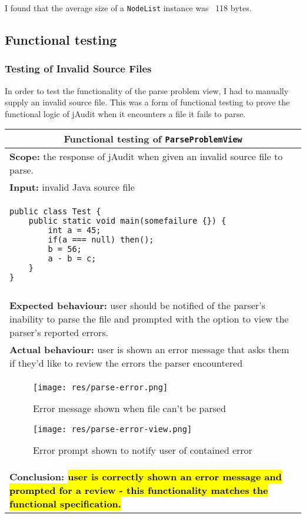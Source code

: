 \documentclass[9pt]{article}
\DeclareRobustCommand{\hlgreen}[1]{{\sethlcolor{green}\hl{#1}}}
\begin{document}
			I found that the average size of a \texttt{NodeList} instance was
			~118 bytes.

	\subsection{Functional testing}
		
		\subsubsection{Testing of Invalid Source Files}
			In order to test the functionality of the parse problem view, I had
			to manually supply an invalid source file. This was a form of
			functional testing to prove the functional logic of jAudit when it
			encounters a file it fails to parse.

			\begin{center}
				\begin{tabular}{ |p{13cm}|  }
					\hline
					\multicolumn{2}{|c|}{Functional testing of
					\texttt{ParseProblemView}} \\
					\hline
						\textbf{Scope:} the response of jAudit when given an
						invalid source file to parse.\\
					\hline
						\textbf{Input:} invalid Java source file \\
					\hline
						\begin{verbatim}
public class Test {
	public static void main(somefailure {}) {
		int a = 45;
		if(a === null) then();
		b = 56;
		a - b = c;
	}
}
						\end{verbatim}\\
					\hline\\
						\textbf{Expected behaviour:} user should be notified of
						the parser's inability to parse the file and prompted
						with the option to view the parser's reported errors. \\
					\hline
						\textbf{Actual behaviour:} user is shown an error
						message that asks them if they'd like to review the
						errors the parser encountered\\
					\hline
					
						\begin{figure}[H]
							\centering
							\texttt{[image: res/parse-error.png]}
							\caption{Error message shown when file can't be parsed}
						\end{figure}

						\begin{figure}[H]
							\centering
							\texttt{[image: res/parse-error-view.png]}
							\caption{Error prompt shown to notify user of contained error}
						\end{figure}
						
					\hline\\
						\textbf{Conclusion: \hlgreen{user is correctly shown an
						error message and prompted for a review - this
						functionality matches the functional specification.} }\\
					\hline
				\end{tabular}
		
		\end{center}
\end{document}
